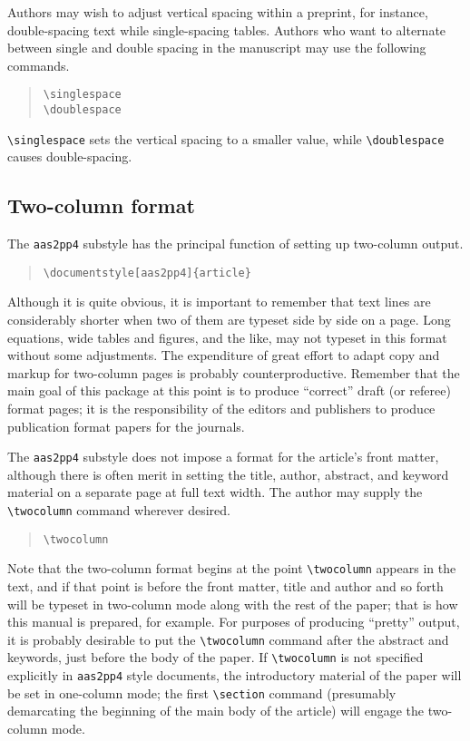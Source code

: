 Authors may wish to adjust vertical spacing within a preprint,
for instance, double-spacing text while single-spacing tables.
Authors who want to alternate between single and double
spacing in the manuscript may use the following commands.
\begin{quote}
\verb"\singlespace"\\
\verb"\doublespace"
\end{quote}
\verb"\singlespace" sets the vertical spacing to a smaller value,
while \verb"\doublespace" causes double-spacing.

\subsection{Two-column format}

The {\tt aas2pp4} substyle has the principal function of setting
up two-column output.
\begin{quote}
\verb"\documentstyle[aas2pp4]{article}"
\end{quote}
Although it is quite obvious, it is important to remember
that text lines are considerably shorter when two of them are typeset
side by side on a page.  Long equations, wide tables and figures, and
the like, may not typeset in this format without some adjustments.
The expenditure of great effort to adapt copy and markup for
two-column pages is probably counterproductive.
Remember that the main
goal of this package at this point is to produce ``correct'' draft
(or referee) format pages;
it is the responsibility of the editors and publishers to
produce publication format papers for the journals.

The {\tt aas2pp4} substyle does not
impose a format for the article's front matter,
although there is often merit in setting the title, author, abstract,
and keyword material on a separate page at full text width.
The author may supply the
\verb"\twocolumn" command wherever desired.
\begin{quote}
\verb"\twocolumn"
\end{quote}
Note that the two-column format begins at the point \verb"\twocolumn"
appears in the text, and if that point is before the front matter,
title and author and so forth will be typeset in two-column mode
along with the rest of the paper; that is how this manual is prepared,
for example.
For purposes of producing ``pretty'' output, it is probably desirable
to put the \verb"\twocolumn" command after the abstract and keywords,
just before the body of the paper.
If \verb"\twocolumn" is not specified explicitly in {\tt aas2pp4}
style documents, the introductory material of the paper will be set
in one-column mode; the first \verb"\section" command (presumably
demarcating the beginning of the main body of the article) will
engage the two-column mode.

